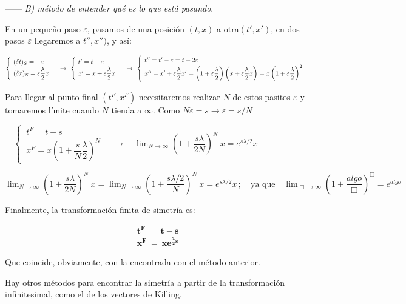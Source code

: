 ------ \emph{B) método de entender qué es lo que está pasando}.

\begin{adjustwidth}{20pt}{20pt}
	En un pequeño paso $\varepsilon$, pasamos de una posición $(t,x)$ a otra$(t',x')$, en dos pasos $\varepsilon$ llegaremos a $t'',x'')$, y así: 
	
	\begin{small} $\begin{cases} \ (\var t)_S=-\varepsilon \\ 	\ (\var x)_S=\varepsilon \dfrac \lambda 2 x \end{cases} \ \to \  \begin{cases} 
	 \ t'=t-\varepsilon \\ \ x'=x+ \varepsilon \dfrac \lambda 2 x \end{cases} \ \to \ 
	 \begin{cases} \  t''=t'-\varepsilon = t-2\varepsilon \\  \  x''=x'+\varepsilon \dfrac \lambda 2 x' = \left(1+\varepsilon \dfrac \lambda 2 \right) \left(x+\varepsilon \dfrac \lambda 2 x \right) =x  \left(1+\varepsilon \dfrac \lambda 2 \right)^2\end{cases}$ \end{small}
	 
	 Para llegar al punto final $(t^F,x^F)$ necesitaremos realizar $N$ de estos pasitos $\varepsilon$ y tomaremos límite cuando $N$ tienda a $\infty$. Como $N\varepsilon =s \to \varepsilon = s/N$
	 
	  $\quad \begin{cases} \ t^F=t-s\\ \ x^F=x\left(1+\dfrac s N \dfrac \lambda 2\right)^N \end{cases} \quad \to \quad \displaystyle \lim_{N\to \infty}{\left(1+\dfrac{s\lambda}{2N} \right)^N\ x } = e^{s\lambda/2} x$
	  
	\begin{footnotesize}
	\textcolor{gris}{
	$\displaystyle \lim_{N\to \infty}{\left(1+\dfrac{s\lambda}{2N} \right)^N\ x } =\lim_{N\to \infty}{\left(1+\dfrac{s\lambda/2}{N} \right)^N\ x } =e^{s\lambda/2} x\, ; \quad \text{ya que} \quad  \lim_{\Box\to \infty} \left( 1+\dfrac{algo}{\Box}\right)^{\Box} =e^{{algo}}$}	\end{footnotesize}
 	 
 	\vspace{5mm} Finalmente,  la transformación finita de simetría es:
 	
 	$$\boldsymbol{ \boxed{ \ \begin{matrix} t^F \ = \ t - s \\ x^F\ = \ x e^{\frac \lambda 2 s} \end{matrix} \ } }$$	
 
 	Que coincide, obviamente, con la encontrada con el método anterior.
 	
 	Hay otros métodos para encontrar la simetría a partir de la transformación infinitesimal, como el de los vectores de Killing.
\end{adjustwidth}

